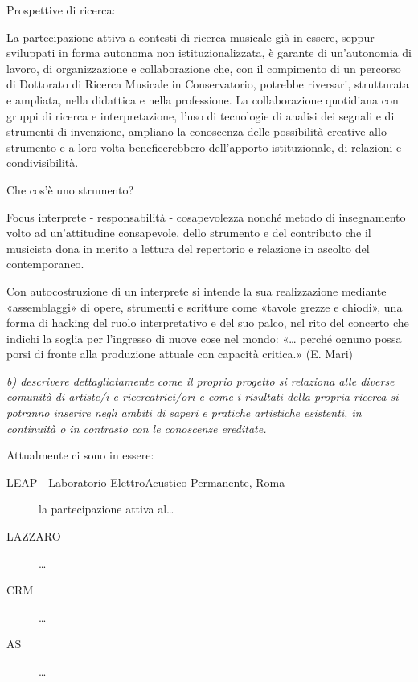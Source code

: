 \documentclass{gs-adonis}
\begin{document}

Prospettive di ricerca:

La partecipazione attiva a contesti di ricerca musicale già in essere, seppur
sviluppati in forma autonoma non istituzionalizzata, è garante di un'autonomia
di lavoro, di organizzazione e collaborazione che, con il compimento di un
percorso di Dottorato di Ricerca Musicale in Conservatorio, potrebbe riversari,
strutturata e ampliata, nella didattica e nella professione. La collaborazione
quotidiana con gruppi di ricerca e interpretazione, l'uso di tecnologie di
analisi dei segnali e di strumenti di invenzione, ampliano la conoscenza
delle possibilità creative allo strumento e a loro volta beneficerebbero
dell'apporto istituzionale, di relazioni e condivisibilità.

Che cos'è uno strumento?

Focus interprete - responsabilità - cosapevolezza
nonché metodo di insegnamento volto ad un'attitudine consapevole, dello strumento e del
contributo che il musicista dona in merito a lettura del repertorio e relazione in ascolto
del contemporaneo.

Con autocostruzione di un interprete si intende la sua realizzazione mediante
«assemblaggi» di opere, strumenti e scritture come «tavole grezze e chiodi»,
una forma di hacking del ruolo interpretativo e del suo palco, nel rito del concerto che indichi la soglia per l'ingresso di nuove cose nel mondo:
«… perché ognuno possa porsi di fronte alla produzione
attuale con capacità critica.» (E. Mari)

\emph{b) descrivere dettagliatamente come il proprio progetto si relaziona alle diverse comunità di artiste/i e ricercatrici/ori e come i risultati della propria ricerca si potranno inserire negli ambiti di saperi e pratiche artistiche esistenti, in continuità o in contrasto con le conoscenze ereditate.}

Attualmente ci sono in essere:

\begin{description}
  \item[LEAP - Laboratorio ElettroAcustico Permanente, Roma] la partecipazione
  attiva al…
  \item[LAZZARO] …
  \item[CRM] …
  \item[AS] …
\end{description}
\end{document}
